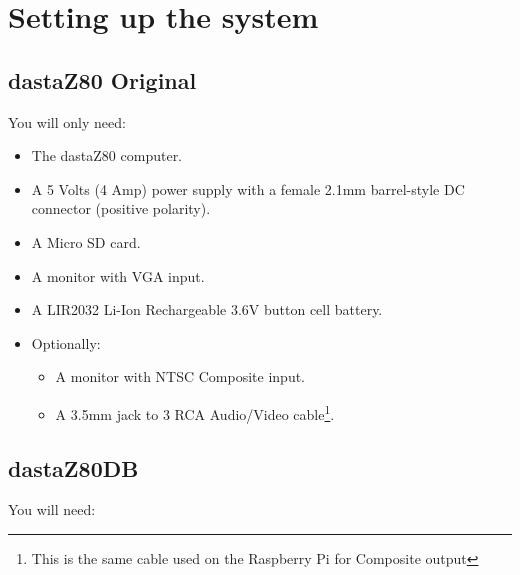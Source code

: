 \section{Setting up the system}
\label{sec:setting_system}

\subsection{dastaZ80 Original}

You will only need:

\begin{itemize}
    \item The dastaZ80 computer.
    \item A 5 Volts (4 Amp) power supply with a female 2.1mm barrel-style DC
    connector (positive polarity).
    \item A Micro SD card.
    \item A monitor with VGA input.
    \item A LIR2032 Li-Ion Rechargeable 3.6V button cell battery.
    \item Optionally:
    \begin{itemize}
        \item A monitor with NTSC Composite input.
        \item A 3.5mm jack to 3 RCA Audio/Video cable\footnote{This is the same
            cable used on the Raspberry Pi for Composite output}.
    \end{itemize}
\end{itemize}

\subsection{dastaZ80DB}

You will need:

